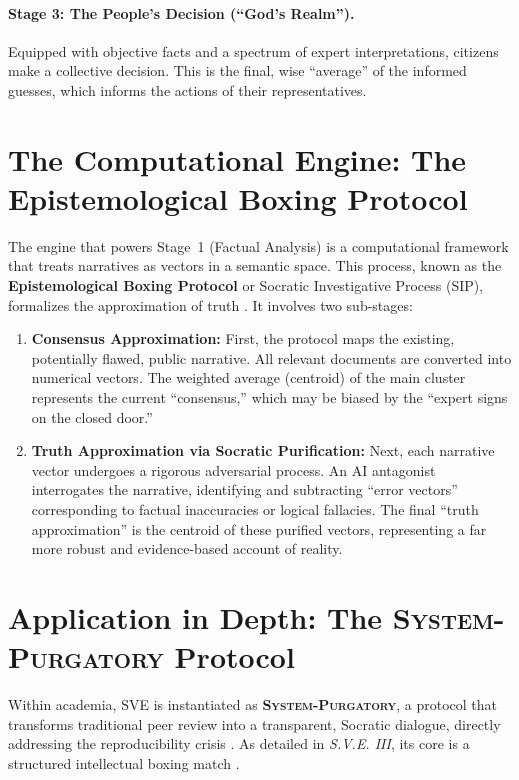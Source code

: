 \documentclass[11pt,a4paper]{article}
\theoremstyle{definition}
\begin{document}
\begin{small}
\paragraph{Stage 3: The People's Decision (``God's Realm'').} Equipped with objective facts and a spectrum of expert interpretations, citizens make a collective decision. This is the final, wise ``average'' of the informed guesses, which informs the actions of their representatives.

\section{The Computational Engine: The Epistemological Boxing Protocol}

The engine that powers Stage~1 (Factual Analysis) is a computational framework that treats narratives as vectors in a semantic space. This process, known as the \textbf{Epistemological Boxing Protocol} or Socratic Investigative Process (SIP), formalizes the approximation of truth \citep{Kovnatsky2025SIP}. It involves two sub-stages:

\begin{enumerate}[itemsep=0.3em]
    \item \textbf{Consensus Approximation:} First, the protocol maps the existing, potentially flawed, public narrative. All relevant documents are converted into numerical vectors. The weighted average (centroid) of the main cluster represents the current ``consensus,'' which may be biased by the ``expert signs on the closed door.''
    
    \item \textbf{Truth Approximation via Socratic Purification:} Next, each narrative vector undergoes a rigorous adversarial process. An AI antagonist interrogates the narrative, identifying and subtracting ``error vectors'' corresponding to factual inaccuracies or logical fallacies. The final ``truth approximation'' is the centroid of these purified vectors, representing a far more robust and evidence-based account of reality.
\end{enumerate}

\section{Application in Depth: The \textsc{System-Purgatory} Protocol}

Within academia, SVE is instantiated as \textbf{\textsc{System-Purgatory}}, a protocol that transforms traditional peer review into a transparent, Socratic dialogue, directly addressing the reproducibility crisis \citep{Ioannidis2005}. As detailed in \emph{S.V.E. III}, its core is a structured intellectual boxing match \citep{Kovnatsky2025SVE3}.


\end{small}
\end{document}
